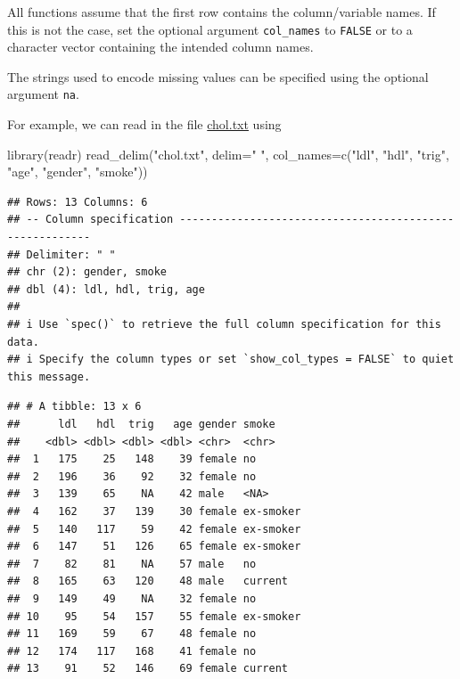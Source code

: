 \documentclass[
]{book}
\newenvironment{Shaded}{\begin{snugshade}}{\end{snugshade}}
\newcommand{\AttributeTok}[1]{\textcolor[rgb]{0.77,0.63,0.00}{#1}}
\newcommand{\FunctionTok}[1]{\textcolor[rgb]{0.00,0.00,0.00}{#1}}
\newcommand{\NormalTok}[1]{#1}
\newcommand{\StringTok}[1]{\textcolor[rgb]{0.31,0.60,0.02}{#1}}
\begin{document}
All functions assume that the first row contains the column/variable names. If this is not the case, set the optional argument \texttt{col\_names} to \texttt{FALSE} or to a character vector containing the intended column names.

The strings used to encode missing values can be specified using the optional argument \texttt{na}.

For example, we can read in the file \href{https://raw.githubusercontent.com/UofGAnalyticsData/R/main/Week\%203/chol.txt}{chol.txt} using

\begin{Shaded}
\begin{Highlighting}[]
\FunctionTok{library}\NormalTok{(readr)}
\FunctionTok{read\_delim}\NormalTok{(}\StringTok{"chol.txt"}\NormalTok{, }\AttributeTok{delim=}\StringTok{" "}\NormalTok{, }\AttributeTok{col\_names=}\FunctionTok{c}\NormalTok{(}\StringTok{"ldl"}\NormalTok{, }\StringTok{"hdl"}\NormalTok{, }\StringTok{"trig"}\NormalTok{,}
                                              \StringTok{"age"}\NormalTok{, }\StringTok{"gender"}\NormalTok{, }\StringTok{"smoke"}\NormalTok{))}
\end{Highlighting}
\end{Shaded}

\begin{verbatim}
## Rows: 13 Columns: 6
## -- Column specification --------------------------------------------------------
## Delimiter: " "
## chr (2): gender, smoke
## dbl (4): ldl, hdl, trig, age
## 
## i Use `spec()` to retrieve the full column specification for this data.
## i Specify the column types or set `show_col_types = FALSE` to quiet this message.
\end{verbatim}

\begin{verbatim}
## # A tibble: 13 x 6
##      ldl   hdl  trig   age gender smoke    
##    <dbl> <dbl> <dbl> <dbl> <chr>  <chr>    
##  1   175    25   148    39 female no       
##  2   196    36    92    32 female no       
##  3   139    65    NA    42 male   <NA>     
##  4   162    37   139    30 female ex-smoker
##  5   140   117    59    42 female ex-smoker
##  6   147    51   126    65 female ex-smoker
##  7    82    81    NA    57 male   no       
##  8   165    63   120    48 male   current  
##  9   149    49    NA    32 female no       
## 10    95    54   157    55 female ex-smoker
## 11   169    59    67    48 female no       
## 12   174   117   168    41 female no       
## 13    91    52   146    69 female current
\end{verbatim}
\end{document}
